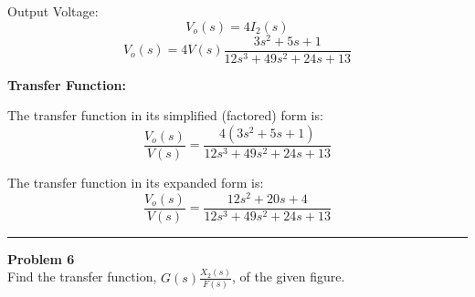 \documentclass[11pt]{article}
\begin{document}
\newpage
{Output Voltage:}
\[
V_o(s) = 4 I_2(s)
\]
\[
V_o(s) = 4 V(s) \frac{3s^2+5s+1}{12s^3 + 49s^2 + 24s + 13}
\]

\bigskip

\textbf{Transfer Function:}

The transfer function in its simplified (factored) form is:
\[
\frac{V_o(s)}{V(s)} = \frac{4(3s^2+5s+1)}{12s^3 + 49s^2 + 24s + 13}
\]

The transfer function in its expanded form is:
\[
\boxed{
\frac{V_o(s)}{V(s)} = \frac{12s^2+20s+4}{12s^3 + 49s^2 + 24s + 13}
}
\]



\newpage
  \setcounter{page}{10}  
\noindent\rule{\textwidth}{1pt}
\noindent\textbf{Problem 6} \hfill 
\\ Find the transfer function, $G(s)\frac{X_2(s)}{F(s)}$, of the given figure.
\end{document}
